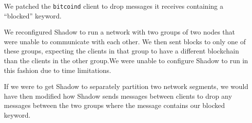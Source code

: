 We patched the \texttt{bitcoind} client to drop messages it receives containing a ``blocked'' keyword.

We reconfigured Shadow to run a network with two groups of two nodes that were unable to communicate with each other. We then sent blocks to only one of these groups, expecting the clients in that group to have a different blockchain than the clients in the other group.We were unable to configure Shadow to run in this fashion due to time limitations.

If we were to get Shadow to separately partition two network segments, we would have then modified how Shadow sends messages between clients to drop any messages between the two groups where the message contains our blocked keyword.
